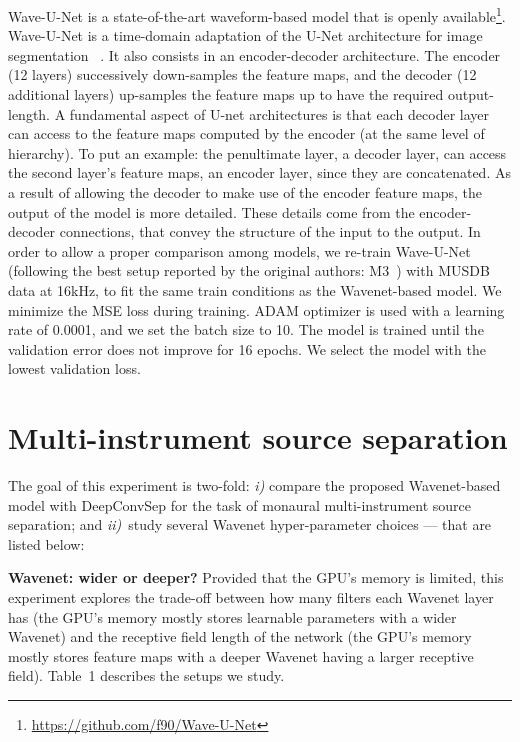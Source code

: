 \documentclass[a4paper]{article}
\begin{document}
Wave-U-Net \cite{stoller2018wave} is a state-of-the-art waveform-based model that is openly available\footnote{\href{https://github.com/f90/Wave-U-Net}{https://github.com/f90/Wave-U-Net}}. 
Wave-U-Net is a time-domain adaptation of the U-Net architecture for image segmentation~ \cite{ronneberger2015u}. It also consists in an encoder-decoder architecture. The encoder (12 layers) successively down-samples the feature maps, and the decoder (12 additional layers) up-samples the feature maps up to have the required output-length. A fundamental aspect of U-net architectures is that each decoder layer can access to the feature maps computed by the encoder (at the same level of hierarchy). To put an example: the penultimate layer, a decoder layer, can access the second layer's feature maps, an encoder layer, since they are concatenated. As a result of allowing the decoder to make use of the encoder feature maps, the output of the model is more detailed. These details come from the encoder-decoder connections, that convey the structure of the input to the output.
In order to allow a proper comparison among models, we re-train Wave-U-Net (following the best setup reported by the original authors: M3~\cite{stoller2018wave}) with MUSDB data at 16kHz, to fit the same train conditions as the Wavenet-based model.
We minimize the MSE loss during training. ADAM optimizer is used with a learning rate of 0.0001, and we set the batch size to 10. The model is trained until the validation error does not improve for 16 epochs. We select the model with the lowest validation loss.

\vspace{-1mm}
\section{Multi-instrument source separation}


The goal of this experiment is two-fold: \textit{i)} compare the proposed Wavenet-based model with DeepConvSep for the task of monaural multi-instrument source separation; and  \textit{ii)}~study several Wavenet hyper-parameter choices --- that are listed below:

\noindent \textbf{Wavenet: wider or deeper?}  
Provided that the GPU's memory is limited, this experiment explores the trade-off between how many filters each Wavenet layer has (the GPU's memory mostly stores learnable parameters with a wider Wavenet) and the receptive field length of the network (the GPU's memory mostly stores feature maps with a deeper Wavenet having a larger receptive field). Table~1 describes the setups we study.
\end{document}
